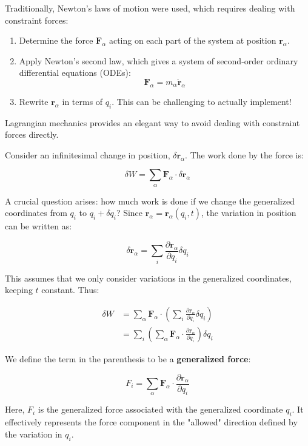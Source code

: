Traditionally, Newton's laws of motion were used, which requires dealing with constraint 
forces:

\begin{enumerate}
    \item Determine the force $\mathbf{F}_\alpha$ acting on each part of the system at 
    position $\mathbf{r}_\alpha$.
    \item Apply Newton's second law, which gives a system of second-order ordinary 
    differential equations (ODEs):
    \[
        \mathbf{F}_\alpha = m_\alpha \ddot{\mathbf{r}}_\alpha
    \]
    \item  Rewrite $\mathbf{r}_\alpha$ in terms of $q_i$. This can be challenging to 
    actually implement!
\end{enumerate}

Lagrangian mechanics provides an elegant way to avoid dealing with constraint forces 
directly.

Consider an infinitesimal change in position, $\delta \mathbf{r}_\alpha$. The work done 
by the force is:

\[
    \delta W = \sum_{\alpha} \mathbf{F}_\alpha \cdot \delta \mathbf{r}_\alpha
\]

A crucial question arises: how much work is done if we change the generalized coordinates 
from $q_i$ to $q_i + \delta q_i$? Since  $\mathbf{r}_\alpha = \mathbf{r}_\alpha(q_i, t)$, 
the variation in position can be written as:

\[
    \delta \mathbf{r}_\alpha = \sum_{i} \frac{\partial \mathbf{r}_\alpha}{\partial q_i} \delta q_i
\]

This assumes that we only consider variations in the generalized coordinates, keeping 
$t$ constant. Thus:

\begin{align*}
    \delta W &= \sum_{\alpha} \mathbf{F}_\alpha \cdot \left(\sum_{i} \frac{\partial \mathbf{r}_\alpha}{\partial q_i} \delta q_i \right) \\
             &= \sum_{i} \left(\sum_{\alpha} \mathbf{F}_{\alpha} \cdot \frac{ \partial \mathbf{r}_\alpha}{\partial q_i} \right) \delta q_i
\end{align*}

We define the term in the parenthesis to be a \textbf{generalized force}:

\[
    F_i = \sum_{\alpha} \mathbf{F}_{\alpha} \cdot \frac{\partial \mathbf{r}_\alpha}{\partial q_i}
\]

Here, $F_i$ is the generalized force associated with the generalized coordinate $q_i$. It effectively represents the force component in the "allowed" direction defined by the variation in $q_i$.

